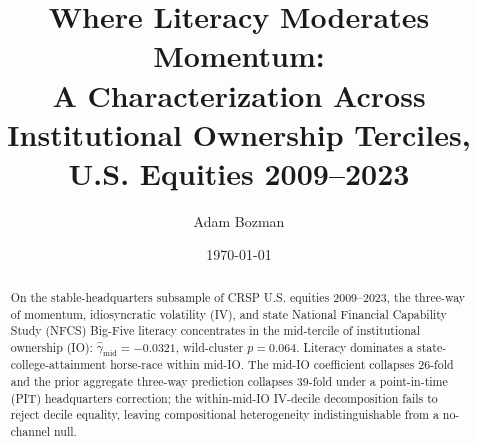 \documentclass[12pt]{article}
\title{Where Literacy Moderates Momentum:\\
A Characterization Across Institutional Ownership Terciles,\\
U.S. Equities 2009--2023}
\author{Adam Bozman}
\date{\today}
\begin{document}
\maketitle

\begin{abstract}
\noindent
On the stable-headquarters subsample of CRSP U.S. equities 2009--2023, the three-way of momentum, idiosyncratic volatility (IV), and state National Financial Capability Study (NFCS) Big-Five literacy concentrates in the mid-tercile of institutional ownership (IO): $\hat\gamma_{\text{mid}} = -0.0321$, wild-cluster $p = 0.064$. Literacy dominates a state-college-attainment horse-race within mid-IO. The mid-IO coefficient collapses 26-fold and the prior aggregate three-way prediction collapses 39-fold under a point-in-time (PIT) headquarters correction; the within-mid-IO IV-decile decomposition fails to reject decile equality, leaving compositional heterogeneity indistinguishable from a no-channel null.
\end{abstract}












\end{document}
